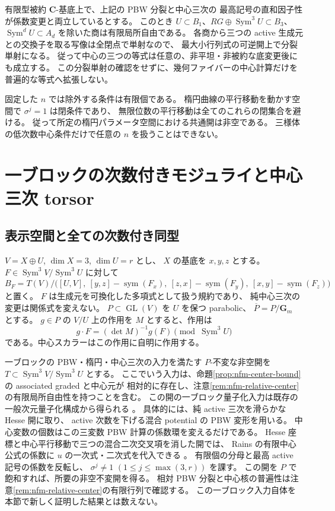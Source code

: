 \begin{remark}[相対版で必要な普遍性]
\label{rem:nfm-relative-center}
有限型被約 $\mathbf C$-基底上で、上記の PBW 分裂と中心三次の
最高記号の直和因子性が係数変更と両立しているとする。
このとき $U\subset B_1$、$RG\oplus\operatorname{Sym}^3U\subset B_3$、
$\operatorname{Sym}^dU\subset A_d$ を除いた商は有限局所自由である。
各商から三つの active 生成元との交換子を取る写像は全閉点で単射なので、
最大小行列式の可逆開上で分裂単射になる。
従って中心の三つの等式は任意の、非平坦・非被約な底変更後にも成立する。
この分裂単射の確認をせずに、幾何ファイバーの中心計算だけを普遍的な等式へ拡張しない。

固定した $n$ では除外する条件は有限個である。
楕円曲線の平行移動を動かす空間で $\sigma^j=1$ は閉条件であり、
無限位数の平行移動は全てのこれらの閉集合を避ける。
従って所定の楕円パラメータ空間における共通開は非空である。
三様体の低次数中心条件だけで任意の $n$ を扱うことはできない。
\end{remark}

\section{一ブロックの次数付きモジュライと中心三次 torsor}
\label{sec:nfm-graded-stack}

\subsection{表示空間と全ての次数付き同型}

$V=X\oplus U$, $\dim X=3$, $\dim U=r$ とし、
$X$ の基底を $x,y,z$ とする。
$F\in\operatorname{Sym}^3V/\operatorname{Sym}^3U$ に対して
\[
 B_F=T(V)/\bigl([U,V],\ [y,z]-\operatorname{sym}(F_x),\
 [z,x]-\operatorname{sym}(F_y),\ [x,y]-\operatorname{sym}(F_z)\bigr)
\]
と置く。
$F$ は生成元を可換化した多項式として扱う規約であり、
純中心三次の変更は関係式を変えない。
$P\subset\operatorname{GL}(V)$ を $U$ を保つ parabolic、
$\overline P=P/\mathbf G_m$ とする。
$g\in P$ の $V/U$ 上の作用を $M$ とすると、作用は
\[
 g\cdot F=(\det M)^{-1}g(F)\pmod{\operatorname{Sym}^3U}
\]
である。中心スカラーはこの作用に自明に作用する。

一ブロックの PBW・楕円・中心三次の入力を満たす $P$-不変な非空開を
$T\subset\operatorname{Sym}^3V/\operatorname{Sym}^3U$ とする。
ここでいう入力は、命題\ref{prop:nfm-center-bound}の associated graded と中心元が
相対的に存在し、注意\ref{rem:nfm-relative-center}の有限局所自由性を持つことを含む。
この開の一ブロック量子化入力は既存の一般次元量子化構成から得られる
\cite{CubicQuantization}。
具体的には、純 active 三次を滑らかな Hesse 開に取り、
active 次数を下げる混合 potential の PBW 変形を用いる。
中心変数の個数はこの三変数 PBW 計算の係数環を変えるだけである。
Hesse 座標と中心平行移動で三つの混合二次交叉項を消した開では、
Rains の有限中心公式の係数に $u$ の一次式・二次式を代入できる
\cite[Theorem~3.3.2 and Section~9]{NFMEG}。
有限個の分母と最高 active 記号の係数を反転し、
$\sigma^j\ne1$ $(1\leq j\leq\max(3,r))$ を課す。
この開を $P$ で飽和すれば、所要の非空不変開を得る。
相対 PBW 分裂と中心核の普遍性は注意\ref{rem:nfm-relative-center}の有限行列で確認する。
この一ブロック入力自体を本節で新しく証明した結果とは数えない。

